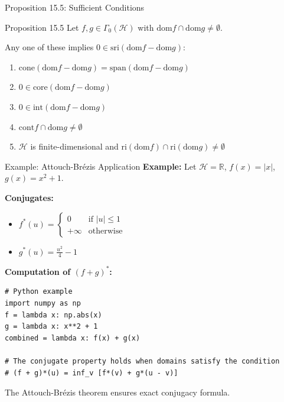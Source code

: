 \documentclass[aspectratio=169,10pt]{beamer}
\begin{document}
\begin{frame}{Proposition 15.5: Sufficient Conditions}
  \begin{block}{Proposition 15.5}
    Let $f, g \in \Gamma_0(\mathcal{H})$ with $\text{dom} f \cap \text{dom} g \neq \emptyset$.
    
    Any one of these implies $0 \in \text{sri}(\text{dom} f - \text{dom} g)$:
    \begin{enumerate}
      \item[(i)] $\text{cone}(\text{dom} f - \text{dom} g) = \text{span}(\text{dom} f - \text{dom} g)$
      \item[(ii)] $0 \in \text{core}(\text{dom} f - \text{dom} g)$
      \item[(iii)] $0 \in \text{int}(\text{dom} f - \text{dom} g)$
      \item[(iv)] $\text{cont} f \cap \text{dom} g \neq \emptyset$
      \item[(v)] $\mathcal{H}$ is finite-dimensional and $\text{ri}(\text{dom} f) \cap \text{ri}(\text{dom} g) \neq \emptyset$
    \end{enumerate}
  \end{block}
\end{frame}

\begin{frame}[fragile]{Example: Attouch-Brézis Application}
  \textbf{Example:} Let $\mathcal{H} = \mathbb{R}$, $f(x) = |x|$, $g(x) = x^2 + 1$.
  
  \vspace{0.3cm}
  \textbf{Conjugates:}
  \begin{itemize}
    \item $f^*(u) = \begin{cases} 0 & \text{if } |u| \leq 1 \\ +\infty & \text{otherwise} \end{cases}$
    \item $g^*(u) = \frac{u^2}{4} - 1$
  \end{itemize}
  
  \vspace{0.3cm}
  
  \textbf{Computation of $(f+g)^*$:}
  \begin{lstlisting}
# Python example
import numpy as np
f = lambda x: np.abs(x)
g = lambda x: x**2 + 1
combined = lambda x: f(x) + g(x)

# The conjugate property holds when domains satisfy the condition
# (f + g)*(u) = inf_v [f*(v) + g*(u - v)]
  \end{lstlisting}
  
  The Attouch-Brézis theorem ensures exact conjugacy formula.
\end{frame}
\end{document}
